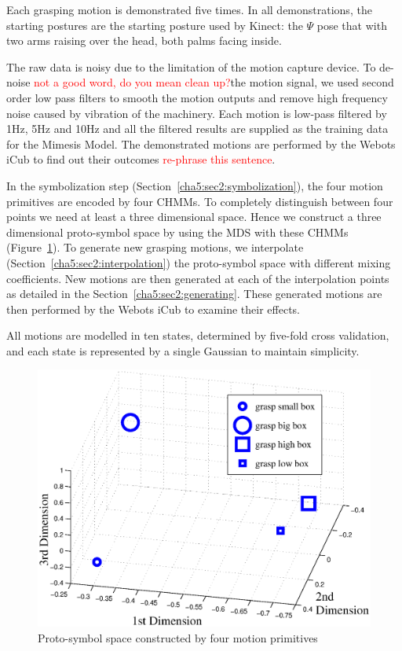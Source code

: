 Each grasping motion is demonstrated five times. In all demonstrations, the starting postures are the starting posture used by Kinect: the $\Psi$ pose that with two arms raising over the head, both palms facing inside.

The raw data is noisy due to the limitation of the motion capture device. To de-noise \textcolor{red}{not a good word, do you mean clean up?}the motion signal, we used second order low pass filters to smooth the motion outputs and remove high frequency noise caused by vibration of the machinery. Each motion is low-pass filtered by 1Hz, 5Hz and 10Hz and all the filtered results are supplied as the training data for the Mimesis Model. The demonstrated motions are performed by the Webots iCub to find out their outcomes \textcolor{red}{re-phrase this sentence}.

In the symbolization step (Section~\ref{cha5:sec2:symbolization}), the four motion primitives are encoded by four CHMMs. To completely distinguish between four points we need at least a three dimensional space. Hence we construct a three dimensional proto-symbol space by using the MDS with these CHMMs (Figure~\ref{fig:pss}). To generate new grasping motions, we interpolate (Section~\ref{cha5:sec2:interpolation}) the proto-symbol space with different mixing coefficients. New motions are then generated at each of the interpolation points as detailed in the Section~\ref{cha5:sec2:generating}. These generated motions are then performed by the Webots iCub to examine their effects.


All motions are modelled in ten states, determined by five-fold cross validation, and each state is represented by a single Gaussian to maintain simplicity.


\begin{figure}
  \centering
  \includegraphics[width=12cm]{./fig_cha5/pss2.eps}
  \caption{ \scriptsize{Proto-symbol space constructed by four motion primitives}
}
    \label{fig:pss}
\end{figure}


